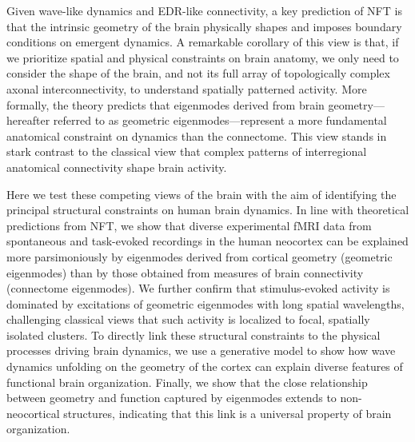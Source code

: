 \documentclass[sn-mathphys-num]{sn-jnl}%
\theoremstyle{thmstyleone}%
\theoremstyle{thmstyletwo}%
\theoremstyle{thmstylethree}%
\begin{document}
Given wave-like dynamics and EDR-like connectivity, a key prediction of NFT is that the intrinsic geometry of the brain physically shapes and imposes boundary conditions on emergent dynamics\cite{robinson2016eigenmodes,gabay2017cortical,gabay2018dynamics}. 
A remarkable corollary of this view is that, if we prioritize spatial and physical constraints on brain anatomy, we only need to consider the shape of the brain, and not its full array of topologically complex axonal interconnectivity, to understand spatially patterned activity. 
More formally, the theory predicts that eigenmodes derived from brain geometry—hereafter referred to as geometric eigenmodes—represent a more fundamental anatomical constraint on dynamics than the connectome\cite{robinson2016eigenmodes,gabay2017cortical,gabay2018dynamics}. 
This view stands in stark contrast to the classical view that complex patterns of interregional anatomical connectivity shape brain activity\cite{honey2007network}.


Here we test these competing views of the brain with the aim of identifying the principal structural constraints on human brain dynamics. 
In line with theoretical predictions from NFT, we show that diverse experimental fMRI data from spontaneous and task-evoked recordings in the human neocortex can be explained more parsimoniously by eigenmodes derived from cortical geometry (geometric eigenmodes) than by those obtained from measures of brain connectivity (connectome eigenmodes). 
We further confirm that stimulus-evoked activity is dominated by excitations of geometric eigenmodes with long spatial wavelengths, challenging classical views that such activity is localized to focal, spatially isolated clusters. 
To directly link these structural constraints to the physical processes driving brain dynamics, we use a generative model to show how wave dynamics unfolding on the geometry of the cortex can explain diverse features of functional brain organization. 
Finally, we show that the close relationship between geometry and function captured by eigenmodes extends to non-neocortical structures, indicating that this link is a universal property of brain organization.



%
\end{document}
